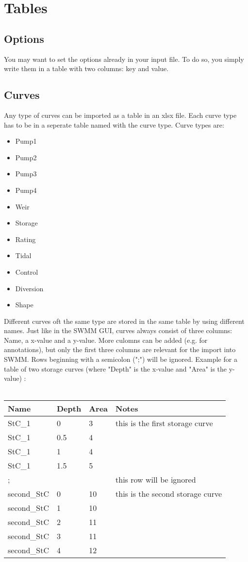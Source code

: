 \documentclass[10pt,a4paper,oneside]{scrbook}
\begin{document}
\section{Tables}

\subsection{Options}
You may want to set the options already in your input file. To do so, you simply write them in a table with two columns: key and value. \newline


\subsection{Curves}
Any type of curves can be imported as a table in an xlsx file. Each curve type has to be in a seperate table named with the curve type. Curve types are:
\begin{itemize}
\item Pump1
\item Pump2
\item Pump3
\item Pump4
\item Weir
\item Storage
\item Rating
\item Tidal
\item Control
\item Diversion
\item Shape
\end{itemize}
Different curves oft the same type are stored in the same table by using different names. Just like in the SWMM GUI, curves always consist of three columns: Name, a x-value and a y-value. More culomns can be added (e.g. for annotations), but only the first three columns are relevant for the import into SWMM. Rows beginning with a semicolon (";") will be ignored. Example for a table of two storage curves (where "Depth" is the x-value and "Area" is the y-value) :\\
\\
\begin{tabular}{|p{1.7cm}|p{1.3cm}|P{1.3cm}|P{6cm}|}
\hline 
\textbf{Name} & \textbf{Depth} & \textbf{Area} & \textbf{Notes}\\ 
\hline 
StC\_1 & 0 & 3 & this is the first storage curve\\
\hline 
StC\_1 & 0.5 & 4 & \\
\hline 
StC\_1 & 1 & 4 & \\
\hline 
StC\_1 & 1.5 & 5 & \\
\hline 
; &  &  & this row will be ignored\\
\hline 
second\_StC & 0 & 10 & this is the second storage curve\\
\hline 
second\_StC & 1 & 10 & \\
\hline 
second\_StC & 2 & 11 & \\
\hline 
second\_StC & 3 & 11 & \\
\hline 
second\_StC & 4 & 12 & \\
\hline 
\end{tabular}
\end{document}
